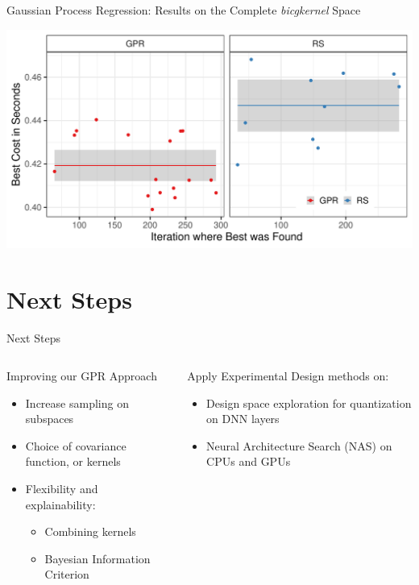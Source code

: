 \documentclass[10pt, compress, aspectratio=169, xcolor={table,usenames,dvipsnames}]{beamer}
\begin{document}
\begin{frame}[label={sec:org7fc8dc4}]{Gaussian Process Regression: Results on the Complete \emph{bicgkernel} Space}
\begin{center}
\includegraphics[width=.95\columnwidth]{../../../img/bicgkernel_gpr_results.pdf}
\end{center}
\end{frame}
\section{Next Steps}
\label{sec:org4c79a47}
\begin{frame}[label={sec:org2dd662a}]{Next Steps}
\begin{columns}
\begin{column}{0.5\columnwidth}
\begin{block}{Improving our GPR Approach}
\begin{itemize}
\item Increase sampling on subspaces
\item Choice of \alert{covariance function}, or \alert{kernels}
\item \alert{Flexibility} and \alert{explainability}:
\begin{itemize}
\item Combining kernels
\item Bayesian Information Criterion
\end{itemize}
\end{itemize}
\end{block}
\end{column}
\begin{column}{0.5\columnwidth}
\begin{block}{Apply Experimental Design methods on:}
\begin{itemize}
\item Design space exploration for \alert{quantization} on DNN layers
\item Neural Architecture Search (\alert{NAS}) on CPUs and GPUs
\end{itemize}
\end{block}
\end{column}
\end{columns}
\end{frame}
\maketitle
\end{document}
